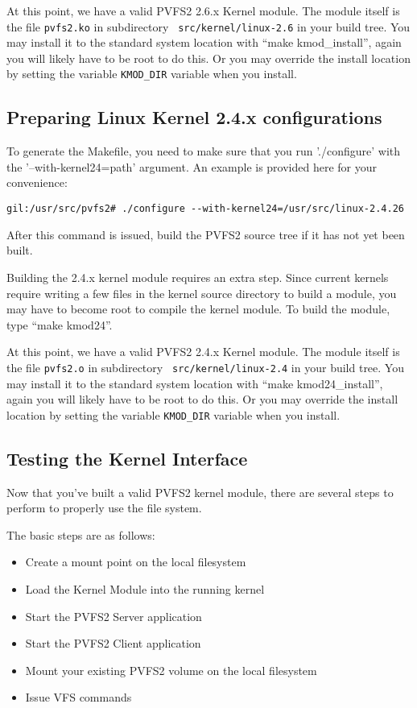 \documentclass[11pt, letterpaper]{article}
\begin{document}
At this point, we have a valid PVFS2 2.6.x Kernel module.  The module
itself is the file {\tt pvfs2.ko} in subdirectory {\tt
src/kernel/linux-2.6} in your build tree.  You may install it to the
standard system location with ``make kmod\_install'', again you will
likely have to be root to do this.  Or you may override the install
location by setting the variable {\tt KMOD\_DIR} variable when you
install.

\subsection{Preparing Linux Kernel 2.4.x configurations}
\label{sec:vfs24-configure}

To generate the Makefile, you need to make sure that you run
'./configure' with the '--with-kernel24=path' argument.  An example is
provided here for your convenience:

\begin{verbatim}
gil:/usr/src/pvfs2# ./configure --with-kernel24=/usr/src/linux-2.4.26
\end{verbatim}

After this command is issued, build the PVFS2 source tree if it has
not yet been built.

Building the 2.4.x kernel module requires an extra step.  Since
current kernels require writing a few files in the kernel source
directory to build a module, you may have to become root to compile
the kernel module.  To build the module, type ``make kmod24''.

At this point, we have a valid PVFS2 2.4.x Kernel module.  The module
itself is the file {\tt pvfs2.o} in subdirectory {\tt
src/kernel/linux-2.4} in your build tree.  You may install it to the
standard system location with ``make kmod24\_install'', again you will
likely have to be root to do this.  Or you may override the install
location by setting the variable {\tt KMOD\_DIR} variable when you
install.

\subsection{Testing the Kernel Interface}
\label{sec:vfs-test}

Now that you've built a valid PVFS2 kernel module, there are several
steps to perform to properly use the file system.

The basic steps are as follows:
\begin{itemize}
\item Create a mount point on the local filesystem
\item Load the Kernel Module into the running kernel
\item Start the PVFS2 Server application
\item Start the PVFS2 Client application
\item Mount your existing PVFS2 volume on the local filesystem
\item Issue VFS commands
\end{itemize}
\end{document}
